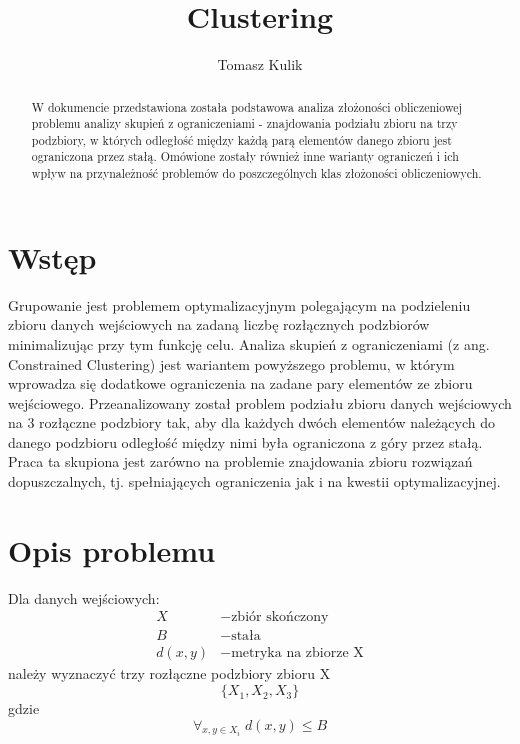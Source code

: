 \documentclass[10pt,a4paper]{article}
\title{Clustering}
\author{Tomasz Kulik}
\date{}
\begin{document}
\maketitle

\begin{abstract}
W dokumencie przedstawiona została podstawowa analiza złożoności obliczeniowej problemu analizy skupień z ograniczeniami -
znajdowania podziału zbioru na trzy podzbiory, w których odległość między każdą parą elementów danego zbioru
jest ograniczona przez stałą. Omówione zostały również inne warianty ograniczeń i ich wpływ na przynależność
problemów do poszczególnych klas złożoności obliczeniowych.
\end{abstract}

\section{Wstęp}\label{sec:wstep}
\par
Grupowanie jest problemem optymalizacyjnym polegającym na podzieleniu zbioru danych wejściowych na zadaną liczbę
rozłącznych podzbiorów minimalizując przy tym funkcję celu. Analiza skupień z ograniczeniami (z ang. Constrained
Clustering) jest wariantem powyższego problemu, w którym wprowadza się dodatkowe ograniczenia na zadane pary
elementów ze zbioru wejściowego. Przeanalizowany został problem podziału zbioru danych wejściowych na 3 rozłączne
podzbiory tak, aby dla każdych dwóch elementów należących do danego podzbioru odległość między nimi była ograniczona
z góry przez stałą. Praca ta skupiona jest zarówno na problemie znajdowania zbioru rozwiązań dopuszczalnych,
tj. spełniających ograniczenia jak i na kwestii optymalizacyjnej.

\section{Opis problemu}\label{sec:problem}
Dla danych wejściowych:
\begin{equation}
	\begin{aligned}
    X & - \text{zbiór skończony} \\
    B & - \text{stała} \\
    d(x,y) &- \text{metryka na zbiorze X}
    \end{aligned}
\end{equation}
należy wyznaczyć trzy rozłączne podzbiory zbioru X
\begin{equation}
	\{ X_{1}, X_{2}, X_{3} \}
\end{equation}
gdzie
\begin{equation}
	\forall_{x,y \in X_{i}} \; d(x, y) \leq B
\end{equation}
\end{document}
